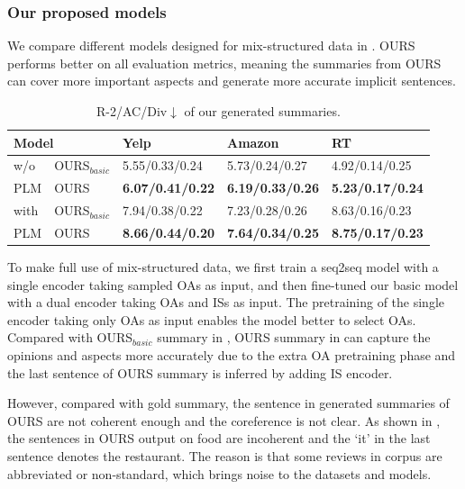 \subsubsection{Our proposed models}
We compare different models designed for mix-structured data in .
OURS performs better on all evaluation metrics,
meaning the summaries from OURS can cover more important aspects and generate more accurate implicit sentences.

\begin{table}[th]
	\centering
	\scriptsize
	\begin{tabular}{|p{0.4cm}|p{1cm}m{1.2cm}<{\centering}m{1.2cm}<{\centering}m{1.3cm}<{\centering}|}
		\hline
		\multicolumn{2}{|l}{\bf Model }& \bf Yelp & \bf Amazon & \bf RT \\ 
		\hline
	      w/o&OURS$_{basic}$ & 5.55/0.33/0.24 & 5.73/0.24/0.27& 4.92/0.14/0.25\\
	    PLM&OURS & \bf 6.07/0.41/0.22 & \bf 6.19/0.33/0.26 & \bf 5.23/0.17/0.24 \\
		\hline
		with&OURS$_{basic}$ & 7.94/0.38/0.22 & 7.23/0.28/0.26 & 8.63/0.16/0.23\\
		PLM&OURS& \bf 8.66/0.44/0.20 & \bf 7.64/0.34/0.25 & \bf 8.75/0.17/0.23 \\
		\hline
	\end{tabular}
	\caption{R-2/AC/Div$\downarrow$ of our generated summaries.}	\label{tab:abla}
\end{table}

To make full use of mix-structured data,
we first train a seq2seq model with a single encoder taking sampled OAs as input, and then fine-tuned our basic model with a dual encoder taking OAs and ISs as input.
The pretraining of the single encoder taking only OAs as input enables the model better to select OAs. 
Compared with OURS$_{basic}$ summary in , OURS summary in  can capture the opinions and aspects more
accurately due to the extra OA pretraining phase and the last sentence of OURS summary is inferred by adding IS encoder.


However, compared with gold summary, the sentence in generated summaries of OURS are not coherent enough 
and the coreference is not clear. 
As shown in , the sentences in OURS output 
on food are incoherent and the `it' in the last sentence denotes the restaurant. The reason is that some reviews in corpus are abbreviated or non-standard, which brings noise to the datasets and models.

